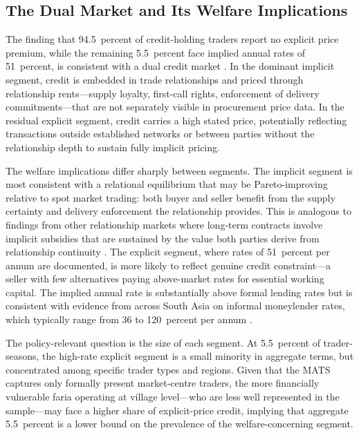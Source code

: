 \documentclass[authoryear,preprint,review,12pt]{elsarticle}
\begin{document}
\subsection{The Dual Market and Its Welfare Implications}

The finding that 94.5~percent of credit-holding traders report no explicit
price premium, while the remaining 5.5~percent face implied annual rates of
51~percent, is consistent with a dual credit market \citep{hoff_stiglitz1990}.
In the dominant implicit segment, credit is embedded in trade relationships
and priced through relationship rents---supply loyalty, first-call rights,
enforcement of delivery commitments---that are not separately visible in
procurement price data. In the residual explicit segment, credit carries a
high stated price, potentially reflecting transactions outside established
networks or between parties without the relationship depth to sustain
fully implicit pricing.

The welfare implications differ sharply between segments. The implicit
segment is most consistent with a relational equilibrium that may be
Pareto-improving relative to spot market trading: both buyer and seller
benefit from the supply certainty and delivery enforcement the relationship
provides. This is analogous to findings from other relationship markets
where long-term contracts involve implicit subsidies that are sustained by
the value both parties derive from relationship continuity
\citep{macchiavello_morjaria2015}. The explicit segment, where rates of
51~percent per annum are documented, is more likely to reflect genuine
credit constraint---a seller with few alternatives paying above-market rates
for essential working capital. The implied annual rate is substantially
above formal lending rates but is consistent with evidence from across
South Asia on informal moneylender rates, which typically range from 36
to 120~percent per annum \citep{hoff_stiglitz1990}.

The policy-relevant question is the size of each segment. At 5.5~percent
of trader-seasons, the high-rate explicit segment is a small minority in
aggregate terms, but concentrated among specific trader types and regions.
Given that the MATS captures only formally present market-centre traders,
the more financially vulnerable faria operating at village level---who
are less well represented in the sample---may face a higher share of
explicit-price credit, implying that aggregate 5.5~percent is a lower
bound on the prevalence of the welfare-concerning segment.
\end{document}
